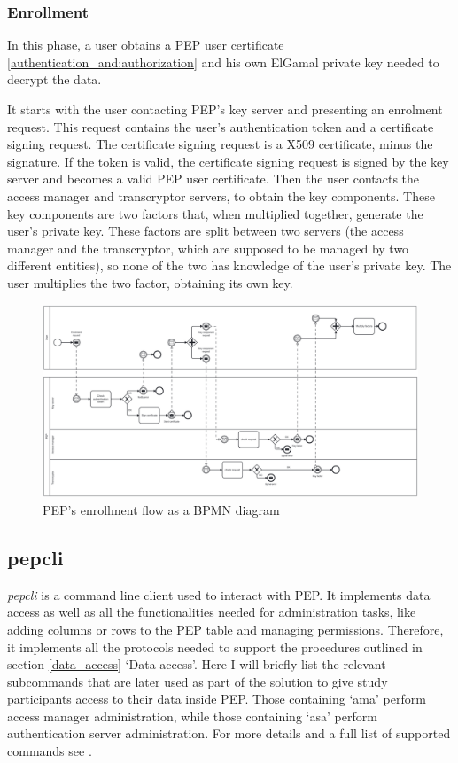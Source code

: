 \documentclass{report}
\begin{document}
\subsubsection{Enrollment}
In this phase, a user obtains a PEP user certificate \ref{authentication_and:authorization} and his own ElGamal private key needed to decrypt the data. \par
It starts with the user contacting PEP's key server and presenting an enrolment request. This request contains the user's authentication token and a certificate signing request.
The certificate signing request is a X509 certificate, minus the signature. If the token is valid, the certificate signing request is signed by the key server and becomes a valid
PEP user certificate. Then the user contacts the access manager and transcryptor servers, to obtain the key components. These key components are two factors that, when multiplied 
together, generate the user's private key. These factors are split between two servers (the access manager and the transcryptor, which are supposed to be managed by two different
entities), so none of the two has knowledge of the user's private key. The user multiplies the two factor, obtaining its own key.

\begin{figure}[H]
	\vspace*{-10pt}
	\includegraphics[scale=0.1, angle=-90]{enrollment}
	\caption{PEP's enrollment flow as a BPMN diagram}
	\label{bpmn-enrollment-flow}
\end{figure}

\subsection{pepcli}\label{pepcli}
\textit{pepcli} \cite{pepcli} is a command line client used to interact with PEP. It implements data access as well as all the functionalities needed for administration tasks, like adding
columns or rows to the PEP table and managing permissions. Therefore, it implements all the protocols needed to support the procedures outlined in section \ref{data_access}
\enquote*{Data access}. Here I will briefly list the relevant subcommands that are later used as part of the solution to give study participants access to their data inside PEP.
Those containing \enquote*{ama} perform access manager administration, while those containing \enquote*{asa} perform authentication server administration.
For more details and a full list of supported commands see \cite{pepcli}.
\end{document}
